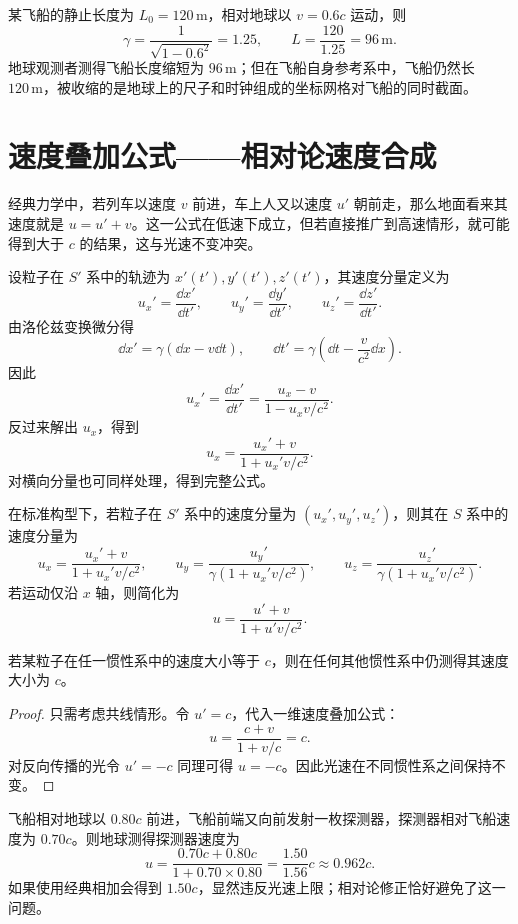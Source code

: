 \begin{example}[运动飞船的长度]
某飞船的静止长度为 $L_0=120\,\mathrm{m}$，相对地球以 $v=0.6c$ 运动，则
\[
\gamma=\frac{1}{\sqrt{1-0.6^2}}=1.25,
\qquad
L=\frac{120}{1.25}=96\,\mathrm{m}.
\]
地球观测者测得飞船长度缩短为 $96\,\mathrm{m}$；但在飞船自身参考系中，飞船仍然长 $120\,\mathrm{m}$，被收缩的是地球上的尺子和时钟组成的坐标网格对飞船的同时截面。
\end{example}

\section{速度叠加公式——相对论速度合成}

经典力学中，若列车以速度 $v$ 前进，车上人又以速度 $u'$ 朝前走，那么地面看来其速度就是 $u=u'+v$。这一公式在低速下成立，但若直接推广到高速情形，就可能得到大于 $c$ 的结果，这与光速不变冲突。

设粒子在 $S'$ 系中的轨迹为 $x'(t'),y'(t'),z'(t')$，其速度分量定义为
\[
u_x'=\frac{\dd x'}{\dd t'},
\qquad
u_y'=\frac{\dd y'}{\dd t'},
\qquad
u_z'=\frac{\dd z'}{\dd t'}.
\]
由洛伦兹变换微分得
\[
\dd x'=\gamma(\dd x-v\dd t),
\qquad
\dd t'=\gamma\left(\dd t-\frac{v}{c^2}\dd x\right).
\]
因此
\[
u_x'=\frac{\dd x'}{\dd t'}=\frac{u_x-v}{1-u_xv/c^2}.
\]
反过来解出 $u_x$，得到
\[
u_x=\frac{u_x'+v}{1+u_x'v/c^2}.
\]
对横向分量也可同样处理，得到完整公式。

\begin{law}[相对论速度叠加公式]
在标准构型下，若粒子在 $S'$ 系中的速度分量为 $(u_x',u_y',u_z')$，则其在 $S$ 系中的速度分量为
\[
u_x=\frac{u_x'+v}{1+u_x'v/c^2},
\qquad
u_y=\frac{u_y'}{\gamma\left(1+u_x'v/c^2\right)},
\qquad
u_z=\frac{u_z'}{\gamma\left(1+u_x'v/c^2\right)}.
\]
若运动仅沿 $x$ 轴，则简化为
\[
u=\frac{u'+v}{1+u'v/c^2}.
\]
\end{law}

\begin{theorem}[光速是速度叠加公式的不动点]
若某粒子在任一惯性系中的速度大小等于 $c$，则在任何其他惯性系中仍测得其速度大小为 $c$。
\end{theorem}

\begin{proof}
只需考虑共线情形。令 $u'=c$，代入一维速度叠加公式：
\[
u=\frac{c+v}{1+v/c}=c.
\]
对反向传播的光令 $u'=-c$ 同理可得 $u=-c$。因此光速在不同惯性系之间保持不变。
\end{proof}

\begin{example}[两次高速推进后的速度]
飞船相对地球以 $0.80c$ 前进，飞船前端又向前发射一枚探测器，探测器相对飞船速度为 $0.70c$。则地球测得探测器速度为
\[
u=\frac{0.70c+0.80c}{1+0.70\times 0.80}=\frac{1.50}{1.56}c\approx 0.962c.
\]
如果使用经典相加会得到 $1.50c$，显然违反光速上限；相对论修正恰好避免了这一问题。
\end{example}

